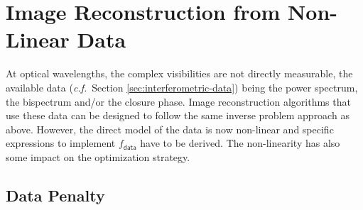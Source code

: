 \documentclass{article}
\newcommand{\Tag}[1]{\mathsf{#1}}        %
\newcommand{\cf}{\textit{c.f.}\xspace}
\newcommand{\DataTag}{\Tag{data}}
\newcommand{\Fcost}{f}
\newcommand{\Fdata}{\Fcost_\DataTag}
\begin{document}

\section{Image Reconstruction from Non-Linear Data}
\label{sec:optical-interferometry}

At optical wavelengths, the complex visibilities are not directly measurable,
the available data (\cf\ Section \ref{sec:interferometric-data}) being the
power spectrum, the bispectrum and/or the closure phase.  Image reconstruction
algorithms that use these data can be designed to follow the same inverse
problem approach as above.  However, the direct model of the data is now
non-linear and specific expressions to implement $\Fdata$ have to be derived.
The non-linearity has also some impact on the optimization strategy.

\subsection{Data Penalty}
\end{document}

